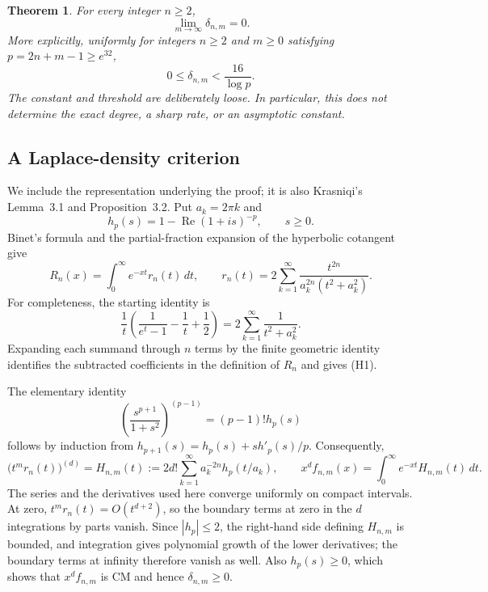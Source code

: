 \documentclass[11pt,a4paper]{article}
\newtheorem{theorem}{Theorem}[section]
\theoremstyle{remark}
\begin{document}
\begin{theorem}\label{thm:heat}
For every integer $n\geq2$,
\[
 \boxed{\lim_{m\to\infty}\delta_{n,m}=0.}
\]
More explicitly, uniformly for integers $n\geq2$ and $m\geq0$ satisfying
$p=2n+m-1\geq e^{32}$,
\[
 \boxed{0\leq\delta_{n,m}<\frac{16}{\log p}.}
\]
The constant and threshold are deliberately loose. In particular, this
does not determine the exact degree, a sharp rate, or an asymptotic
constant.
\end{theorem}

\subsection{A Laplace-density criterion}

We include the representation underlying the proof; it is also
Krasniqi's Lemma~3.1 and Proposition~3.2. Put $a_k=2\pi k$ and
\[
 h_p(s)=1-\operatorname{Re}(1+is)^{-p},\qquad s\geq0.
\]
Binet's formula and the partial-fraction expansion of the hyperbolic
cotangent give
\[
 R_n(x)=\int_0^\infty e^{-xt}r_n(t)\,dt,
 \qquad
 r_n(t)=2\sum_{k=1}^\infty
 \frac{t^{2n}}{a_k^{2n}(t^2+a_k^2)}.
\tag{H1}
\]
For completeness, the starting identity is
\[
 \frac1t\left(\frac1{e^t-1}-\frac1t+\frac12\right)
 =2\sum_{k=1}^\infty\frac1{t^2+a_k^2}.
\]
Expanding each summand through $n$ terms by the finite geometric identity
identifies the subtracted coefficients in the definition of $R_n$
and gives (H1).

The elementary identity
\[
 \left(\frac{s^{p+1}}{1+s^2}\right)^{(p-1)}
 =(p-1)!h_p(s)
\]
follows by induction from
$h_{p+1}(s)=h_p(s)+s h'_p(s)/p$.
Consequently,
\[
 \big(t^m r_n(t)\big)^{(d)}
 =H_{n,m}(t):=2d!\sum_{k=1}^\infty a_k^{-2n}h_p(t/a_k),
 \qquad
 x^df_{n,m}(x)=\int_0^\infty e^{-xt}H_{n,m}(t)\,dt.
\tag{H2}
\]
The series and the derivatives used here converge uniformly on compact
intervals. At zero, $t^m r_n(t)=O(t^{d+2})$, so the boundary terms at
zero in the $d$ integrations by parts vanish. Since $|h_p|\leq2$, the
right-hand side defining $H_{n,m}$ is bounded, and integration gives
polynomial growth of the lower derivatives; the boundary terms at
infinity therefore vanish as well. Also $h_p(s)\geq0$, which shows
that $x^df_{n,m}$ is CM and hence $\delta_{n,m}\geq0$.
\end{document}
